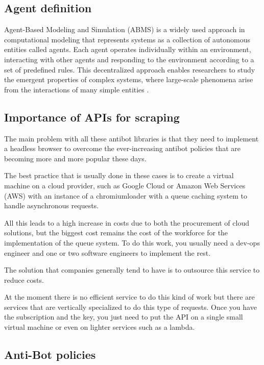 \subsection{Agent definition}
Agent-Based Modeling and Simulation (ABMS) is a widely used approach in computational modeling that represents systems as a collection of autonomous entities called agents. Each agent operates individually within an environment, interacting with other agents and responding to the environment according to a set of predefined rules. This decentralized approach enables researchers to study the emergent properties of complex systems, where large-scale phenomena arise from the interactions of many simple entities \cite{3}.

\subsection{Importance of APIs for scraping}
The main problem with all these antibot libraries is that they need to implement a headless browser to overcome the ever-increasing antibot policies that are becoming more and more popular these days.

The best practice that is usually done in these cases is to create a virtual machine on a cloud provider, such as Google Cloud or Amazon Web Services (AWS) with an instance of a chromiumloader with a queue caching system to handle asynchronous requests.

All this leads to a high increase in costs due to both the procurement of cloud solutions, but the biggest cost remains the cost of the workforce for the implementation of the queue system. To do this work, you usually need a dev-ops engineer and one or two software engineers to implement the rest.

The solution that companies generally tend to have is to outsource this service to reduce costs.

At the moment there is no efficient service to do this kind of work but there are services that are vertically specialized to do this type of requests. Once you have the subscription and the key, you just need to put the API on a single small virtual machine or even on lighter services such as a lambda.

\clearpage

\subsection{Anti-Bot policies}


